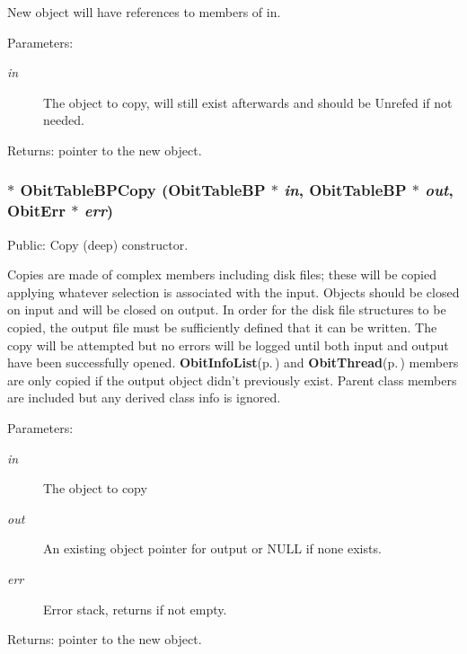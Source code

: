 New object will have references to members of in. \begin{Desc}
\item[Parameters:]
\begin{description}
\item[{\em in}]The object to copy, will still exist afterwards and should be Unrefed if not needed. \end{description}
\end{Desc}
\begin{Desc}
\item[Returns:]pointer to the new object. \end{Desc}
\subsubsection{$\ast$ Obit\-Table\-BPCopy ({\bf Obit\-Table\-BP} $\ast$ {\em in}, {\bf Obit\-Table\-BP} $\ast$ {\em out}, {\bf Obit\-Err} $\ast$ {\em err})}\label{ObitTableBP_8c_a20}


Public: Copy (deep) constructor. 

Copies are made of complex members including disk files; these will be copied applying whatever selection is associated with the input. Objects should be closed on input and will be closed on output. In order for the disk file structures to be copied, the output file must be sufficiently defined that it can be written. The copy will be attempted but no errors will be logged until both input and output have been successfully opened. {\bf Obit\-Info\-List}{\rm (p.\,\pageref{structObitInfoList})} and {\bf Obit\-Thread}{\rm (p.\,\pageref{structObitThread})} members are only copied if the output object didn't previously exist. Parent class members are included but any derived class info is ignored. \begin{Desc}
\item[Parameters:]
\begin{description}
\item[{\em in}]The object to copy \item[{\em out}]An existing object pointer for output or NULL if none exists. \item[{\em err}]Error stack, returns if not empty. \end{description}
\end{Desc}
\begin{Desc}
\item[Returns:]pointer to the new object. \end{Desc}
